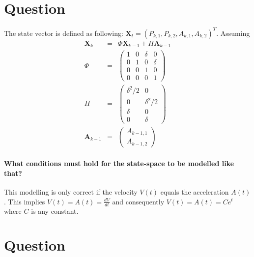 \documentclass[a4paper, 12pt, titlepage]{article}
\begin{document}
\section{Question}

The state vector is defined as following: $\pmb{X}_t=(P_{k,1},P_{k,2},A_{k,1},A_{k,2})^T$.
Assuming 
\begin{eqnarray}
	\pmb{X}_{k} &=& \Phi \pmb{X}_{k-1} + \Pi \pmb{A}_{k-1} \label{eq}\\
	\Phi &=& \left(
		\begin{array}{cccc}
			1 &0 & \delta & 0\\
			0 & 1& 0 & \delta\\
			0 & 0& 1& 0\\
			0 & 0& 0& 1
		\end{array}
	\right)\\
	\Pi &=& \left(
		\begin{array}{cc}
			\delta^2/2 & 0\\
			0 & \delta^2/2\\
			\delta& 0\\
			0 & \delta
		\end{array}
	\right)\\
	\pmb{A}_{k-1} &=& \left (
		\begin{array}{c}
			A_{k-1,1}\\
			A_{k-1,2}
		\end{array}
	\right)
\end{eqnarray}

\paragraph{What conditions must hold for the state-space to be modelled like that?}
This modelling is only correct if the velocity $V(t)$ equals the acceleration $A(t)$. 
This implies $V(t)=A(t)=\frac{dV}{dt}$ and consequently $V(t)=A(t)=Ce^t$ where $C$ is any constant.%

\section{Question}
\end{document}
